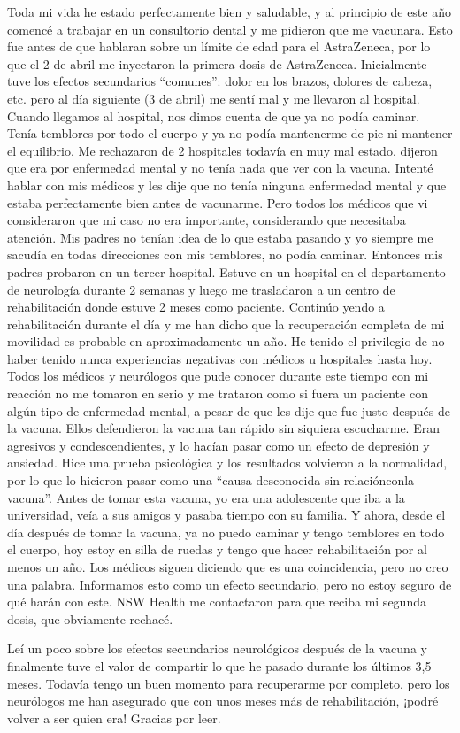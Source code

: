 Toda mi vida he estado perfectamente bien y saludable, y al principio de este
año comencé a trabajar en un consultorio dental y me pidieron que me
vacunara. Esto fue antes de que hablaran sobre un límite de edad para el
AstraZeneca, por lo que el 2 de abril me inyectaron la primera dosis de
AstraZeneca. Inicialmente tuve los efectos secundarios “comunes”: dolor en los
brazos, dolores de cabeza, etc. pero al día siguiente (3 de abril) me sentí mal
y me llevaron al hospital. Cuando llegamos al hospital, nos dimos cuenta de que
ya no podía caminar. Tenía temblores por todo el cuerpo y ya no podía mantenerme
de pie ni mantener el equilibrio. Me rechazaron de 2 hospitales todavía en muy
mal estado, dijeron que era por enfermedad mental y no tenía nada que ver con la
vacuna. Intenté hablar con mis médicos y les dije que no tenía ninguna
enfermedad mental y que estaba perfectamente bien antes de vacunarme. Pero todos
los médicos que vi consideraron que mi caso no era importante, considerando que
necesitaba atención. Mis padres no tenían idea de lo que estaba pasando y yo
siempre me sacudía en todas direcciones con mis temblores, no podía
caminar. Entonces mis padres probaron en un tercer hospital. Estuve en un
hospital en el departamento de neurología durante 2 semanas y luego me
trasladaron a un centro de rehabilitación donde estuve 2 meses como
paciente. Continúo yendo a rehabilitación durante el día y me han dicho que la
recuperación completa de mi movilidad es probable en aproximadamente un año. He
tenido el privilegio de no haber tenido nunca experiencias negativas con médicos
u hospitales hasta hoy. Todos los médicos y neurólogos que pude conocer durante
este tiempo con mi reacción no me tomaron en serio y me trataron como si fuera
un paciente con algún tipo de enfermedad mental, a pesar de que les dije que fue
justo después de la vacuna. Ellos defendieron la vacuna tan rápido sin siquiera
escucharme. Eran agresivos y condescendientes, y lo hacían pasar como un efecto
de depresión y ansiedad. Hice una prueba psicológica y los resultados volvieron
a la normalidad, por lo que lo hicieron pasar como una “causa desconocida sin
relaciónconla vacuna”. Antes de tomar esta vacuna, yo era una adolescente que
iba a la universidad, veía a sus amigos y pasaba tiempo con su familia. Y ahora,
desde el día después de tomar la vacuna, ya no puedo caminar y tengo temblores
en todo el cuerpo, hoy estoy en silla de ruedas y tengo que hacer rehabilitación
por al menos un año. Los médicos siguen diciendo que es una coincidencia, pero
no creo una palabra. Informamos esto como un efecto secundario, pero no estoy
seguro de qué harán con este. NSW Health me contactaron para que reciba mi
segunda dosis, que obviamente rechacé.

Leí un poco sobre los efectos secundarios neurológicos después de la vacuna y
finalmente tuve el valor de compartir lo que he pasado durante los últimos 3,5
meses. Todavía tengo un buen momento para recuperarme por completo, pero los
neurólogos me han asegurado que con unos meses más de rehabilitación, ¡podré
volver a ser quien era! Gracias por leer.

